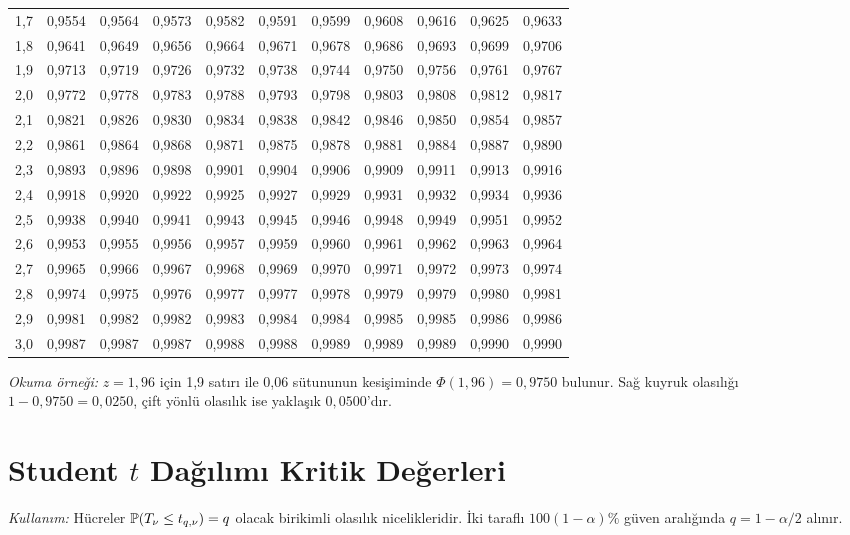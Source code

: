 \begin{center}
{\begin{tabular}{c*{10}{r}}
1,7 & 0,9554 & 0,9564 & 0,9573 & 0,9582 & 0,9591 & 0,9599 & 0,9608 & 0,9616 & 0,9625 & 0,9633 \\
1,8 & 0,9641 & 0,9649 & 0,9656 & 0,9664 & 0,9671 & 0,9678 & 0,9686 & 0,9693 & 0,9699 & 0,9706 \\
1,9 & 0,9713 & 0,9719 & 0,9726 & 0,9732 & 0,9738 & 0,9744 & 0,9750 & 0,9756 & 0,9761 & 0,9767 \\
2,0 & 0,9772 & 0,9778 & 0,9783 & 0,9788 & 0,9793 & 0,9798 & 0,9803 & 0,9808 & 0,9812 & 0,9817 \\
2,1 & 0,9821 & 0,9826 & 0,9830 & 0,9834 & 0,9838 & 0,9842 & 0,9846 & 0,9850 & 0,9854 & 0,9857 \\
2,2 & 0,9861 & 0,9864 & 0,9868 & 0,9871 & 0,9875 & 0,9878 & 0,9881 & 0,9884 & 0,9887 & 0,9890 \\
2,3 & 0,9893 & 0,9896 & 0,9898 & 0,9901 & 0,9904 & 0,9906 & 0,9909 & 0,9911 & 0,9913 & 0,9916 \\
2,4 & 0,9918 & 0,9920 & 0,9922 & 0,9925 & 0,9927 & 0,9929 & 0,9931 & 0,9932 & 0,9934 & 0,9936 \\
2,5 & 0,9938 & 0,9940 & 0,9941 & 0,9943 & 0,9945 & 0,9946 & 0,9948 & 0,9949 & 0,9951 & 0,9952 \\
2,6 & 0,9953 & 0,9955 & 0,9956 & 0,9957 & 0,9959 & 0,9960 & 0,9961 & 0,9962 & 0,9963 & 0,9964 \\
2,7 & 0,9965 & 0,9966 & 0,9967 & 0,9968 & 0,9969 & 0,9970 & 0,9971 & 0,9972 & 0,9973 & 0,9974 \\
2,8 & 0,9974 & 0,9975 & 0,9976 & 0,9977 & 0,9977 & 0,9978 & 0,9979 & 0,9979 & 0,9980 & 0,9981 \\
2,9 & 0,9981 & 0,9982 & 0,9982 & 0,9983 & 0,9984 & 0,9984 & 0,9985 & 0,9985 & 0,9986 & 0,9986 \\
3,0 & 0,9987 & 0,9987 & 0,9987 & 0,9988 & 0,9988 & 0,9989 & 0,9989 & 0,9989 & 0,9990 & 0,9990 \\

\bottomrule
\end{tabular}
}
\end{center}

\textit{Okuma örneği:} $z=1{,}96$ için 1,9 satırı ile 0,06 sütununun
kesişiminde $\Phi(1{,}96)=0{,}9750$ bulunur. Sağ kuyruk olasılığı
$1-0{,}9750=0{,}0250$, çift yönlü olasılık ise yaklaşık $0{,}0500$'dır.


\clearpage
\section[Student t Dağılımı Kritik Değerleri]{Student $t$ Dağılımı Kritik Değerleri}
\label{sec:t-table}
\textit{Kullanım:} Hücreler $\P(T_\nu\leq t_{q,\nu})=q$ olacak birikimli
olasılık nicelikleridir. İki taraflı $100(1-\alpha)\%$ güven aralığında
$q=1-\alpha/2$ alınır.

